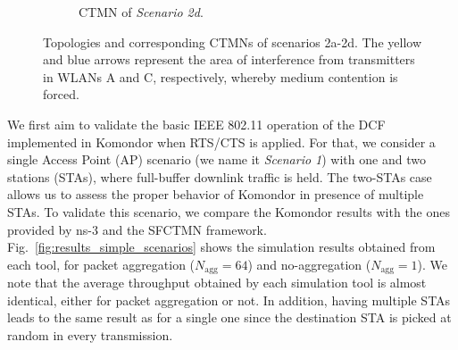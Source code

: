 \documentclass{article}
\begin{document}
\begin{figure}[ht!]
\begin{subfigure}{0.24\textwidth}
			\caption{CTMN of \textit{Scenario 2d}.} \label{fig:c_d}
		\end{subfigure}
		\caption{Topologies and corresponding CTMNs of scenarios 2a-2d. The yellow and blue arrows represent the area of interference from transmitters in WLANs A and C, respectively, whereby medium contention is forced.}
		\label{fig:complex_scenarios}
	\end{figure}
	
	We first aim to validate the basic IEEE 802.11 operation of the DCF implemented in Komondor when RTS/CTS is applied. For that, we consider a single Access Point (AP) scenario (we name it \textit{Scenario 1}) with one and two stations (STAs), where full-buffer downlink traffic is held. The two-STAs case allows us to assess the proper behavior of Komondor in presence of multiple STAs. To validate this scenario, we compare the Komondor results with the ones provided by ns-3 and the SFCTMN framework. Fig.~\ref{fig:results_simple_scenarios} shows the simulation results obtained from each tool, for packet aggregation ($N_{\text{agg}} = 64$) and no-aggregation ($N_{\text{agg}} = 1$). We note that the average throughput obtained by each simulation tool is almost identical, either for packet aggregation or not. In addition, having multiple STAs leads to the same result as for a single one since the destination STA is picked at random in every transmission.
	
\end{document}
